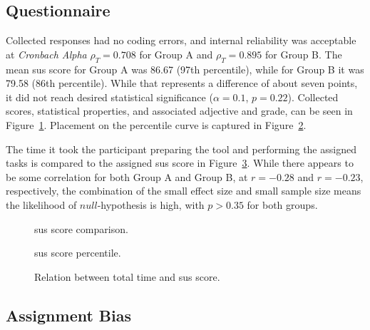 \subsection{Questionnaire}
\label{sec:evaluation-questionnaire}

Collected responses had no coding errors, and internal reliability was acceptable at \emph{Cronbach Alpha} $\rho_T=0.708$ for Group A and $\rho_T=0.895$ for Group B.
The mean \gls{sus} score for Group A was 86.67 (97th percentile), while for Group B it was 79.58 (86th percentile).
While that represents a difference of about seven points, it did not reach desired statistical significance ($\alpha=0.1$, $p=0.22$).
Collected scores, statistical properties, and associated adjective and grade, can be seen in Figure~\ref{fig:plot-sus}.
Placement on the percentile curve is captured in Figure~\ref{fig:plot-sus-percentile}.

The time it took the participant preparing the tool and performing the assigned tasks is compared to the assigned \gls{sus} score in Figure~\ref{fig:plot-sus-time}.
While there appears to be some correlation for both Group A and Group B, at $r=-0.28$ and $r=-0.23$, respectively, the combination of the small effect size and small sample size means the likelihood of $null$-hypothesis is high, with $p > 0.35$ for both groups.

\begin{figure}[H]
    
    \caption{\gls{sus} score comparison.}
    \label{fig:plot-sus}
\end{figure}

\begin{figure}[H]
    
    \caption{\gls{sus} score percentile.}
    \label{fig:plot-sus-percentile}
\end{figure}

\begin{figure}[H]
    
    \caption{Relation between total time and \gls{sus} score.}
    \label{fig:plot-sus-time}
\end{figure}

\subsection{Assignment Bias}

